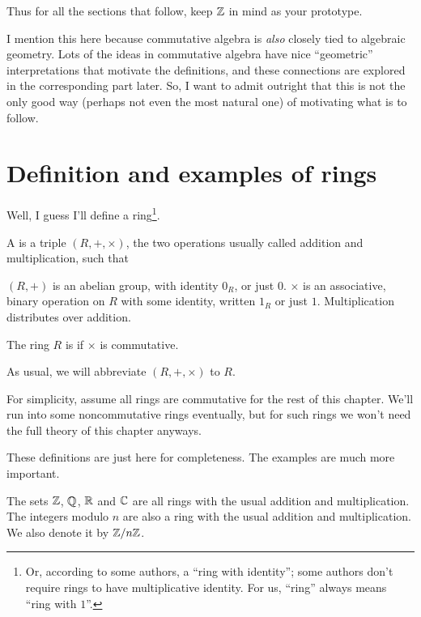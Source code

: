 Thus for all the sections that follow, keep $\mathbb Z$ in mind as your prototype.

I mention this here because
commutative algebra is \emph{also} closely tied to algebraic geometry.
Lots of the ideas in commutative algebra have nice
``geometric'' interpretations that motivate the definitions,
and these connections are explored in the corresponding part later.
So, I want to admit outright that this is not
the only good way (perhaps not even the most natural one)
of motivating what is to follow.

\section{Definition and examples of rings}

Well, I guess I'll define a ring\footnote{Or,
	according to some authors, a ``ring with identity'';
	some authors don't require rings to have multiplicative identity.
	For us, ``ring'' always means ``ring with $1$''.}.

\begin{definition}
	A  is a triple $(R, +, \times)$,
	the two operations usually called addition and multiplication, such that
	\begin{enumerate}[(i)]
		\ii $(R,+)$ is an abelian group, with identity $0_R$, or just $0$.
		\ii $\times$ is an associative, binary operation on $R$ with some
		identity, written $1_R$ or just $1$.
		\ii Multiplication distributes over addition.
	\end{enumerate}
	The ring $R$ is  if $\times$ is commutative.
\end{definition}
\begin{abuse}
	As usual, we will abbreviate $(R, +, \times)$ to $R$.
\end{abuse}
\begin{abuse}
	For simplicity, assume all rings are commutative
	for the rest of this chapter.
	We'll run into some noncommutative rings eventually,
	but for such rings we won't need the full theory of this chapter anyways.
\end{abuse}

These definitions are just here for completeness.
The examples are much more important.
\begin{example}
	\listhack
	\begin{enumerate}[(a)]
		\ii The sets $\mathbb Z$, $\mathbb Q$, $\mathbb R$ and $\mathbb C$ are all rings
		with the usual addition and multiplication.
		\ii The integers modulo $n$ are also a ring
		with the usual addition and multiplication.
		We also denote it by $\mathbb Z/n\mathbb Z$.
	\end{enumerate}
\end{example}

